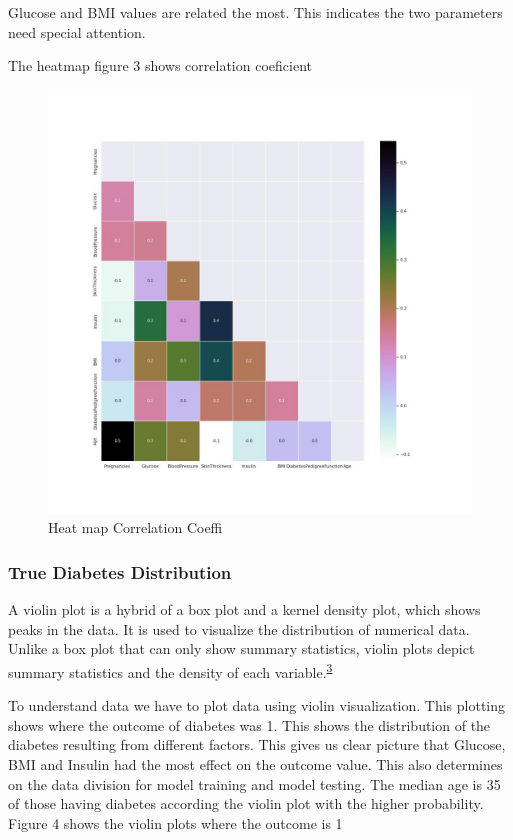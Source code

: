 \documentclass[
]{article}
\begin{document}
Glucose and BMI values are related the most. This indicates the two
parameters need special attention.

The heatmap figure 3 shows correlation coeficient

\begin{figure}
\centering
\includegraphics{Corr.jpg}
\caption{Heat map Correlation Coeffi}
\end{figure}

\hypertarget{true-diabetes-distribution}{%
\subsubsection{True Diabetes
Distribution}\label{true-diabetes-distribution}}

A violin plot is a hybrid of a box plot and a kernel density plot, which
shows peaks in the data. It is used to visualize the distribution of
numerical data. Unlike a box plot that can only show summary statistics,
violin plots depict summary statistics and the density of each
variable.\textsuperscript{\protect\hyperlink{ref-joel}{3}}

To understand data we have to plot data using violin visualization. This
plotting shows where the outcome of diabetes was 1. This shows the
distribution of the diabetes resulting from different factors. This
gives us clear picture that Glucose, BMI and Insulin had the most effect
on the outcome value. This also determines on the data division for
model training and model testing. The median age is 35 of those having
diabetes according the violin plot with the higher probability. Figure 4
shows the violin plots where the outcome is 1
\end{document}
